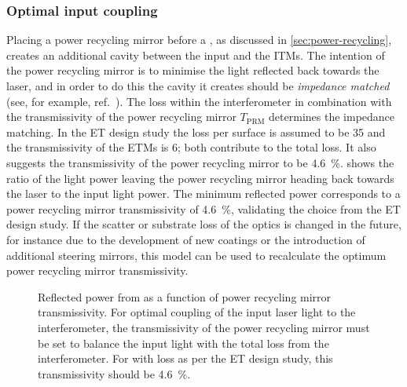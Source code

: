 \subsubsection{Optimal input coupling}
Placing a power recycling mirror before a \MI{}, as discussed in \cref{sec:power-recycling}, creates an additional cavity between the input and the \glspl{ITM}. The intention of the power recycling mirror is to minimise the light reflected back towards the laser, and in order to do this the cavity it creates should be \emph{impedance matched} (see, for example, ref.~\cite[section~5.1]{Freise2010}). The loss within the interferometer in combination with the transmissivity of the power recycling mirror $T_{\text{PRM}}$ determines the impedance matching. In the \gls{ET} design study the loss per surface is assumed to be \SI{35}{\ppm} and the transmissivity of the \glspl{ETM} is \SI{6}{\ppm}; both contribute to the total loss. It also suggests the transmissivity of the power recycling mirror to be \SI{4.6}{\percent}.  shows the ratio of the light power leaving the power recycling mirror heading back towards the laser to the input light power. The minimum reflected power corresponds to a power recycling mirror transmissivity of \SI{4.6}{\percent}, validating the choice from the \gls{ET} design study. If the scatter or substrate loss of the optics is changed in the future, for instance due to the development of new coatings or the introduction of additional steering mirrors, this model can be used to recalculate the optimum power recycling mirror transmissivity.

\begin{figure}
  \centering
  
  \caption[Reflected power from \ETLF{} as a function of power recycling mirror transmissivity]{\label{fig:reflected-power-vs-prm-trans}Reflected power from \ETLF{} as a function of power recycling mirror transmissivity. For optimal coupling of the input laser light to the interferometer, the transmissivity of the power recycling mirror must be set to balance the input light with the total loss from the interferometer. For \ETLF{} with loss as per the \gls{ET} design study, this transmissivity should be \SI{4.6}{\percent}.}
\end{figure}

